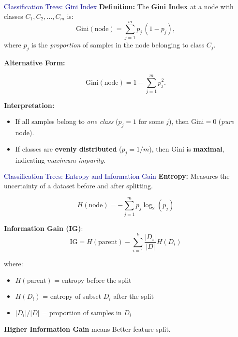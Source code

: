 \begin{frame}{\textcolor{darkblue}{Classification Trees: Gini Index}}
\small
    \textbf{Definition:} The \textbf{Gini Index} at a node with classes \( C_1, C_2, \dots, C_m \) is:
    \[
    \text{Gini}(\text{node}) = \sum_{j=1}^{m} p_j \,(1 - p_j),
    \]
    where \( p_j \) is the \emph{proportion} of samples in the node belonging to class \( C_j \).

    \medskip
    \textbf{Alternative Form:}

    $$\text{Gini}(\text{node}) = 1 - \sum_{j=1}^{m} p_j^2.$$
    
    \textbf{Interpretation:}
    \begin{itemize}
        \item If all samples belong to \emph{one class} (\( p_j = 1 \) for some \( j \)), then \( \text{Gini} = 0 \) (\textit{pure} node).
        \item If classes are \textbf{evenly distributed} (\( p_j = 1/m \)), then \( \text{Gini} \) is \textbf{maximal}, indicating \textit{maximum impurity}.
    \end{itemize}
\end{frame}

\begin{frame}{\textcolor{darkblue}{Classification Trees: Entropy and Information Gain}}
\small
    \textbf{Entropy:} Measures the uncertainty of a dataset before and after splitting.

    \[
    H(\text{node}) = - \sum_{j=1}^{m} p_j \log_2 (p_j)
    \]

    \textbf{Information Gain (IG)}:
    \[
    \text{IG} = H(\text{parent}) - \sum_{i=1}^{k} \frac{|D_i|}{|D|} H(D_i)
    \]

    where:
    \begin{itemize}
        \item \( H(\text{parent}) \) = entropy before the split
        \item \( H(D_i) \) = entropy of subset \( D_i \) after the split
        \item \( |D_i| / |D| \) = proportion of samples in \( D_i \)
    \end{itemize}

    \textbf{Higher Information Gain} means Better feature split.
\end{frame}

